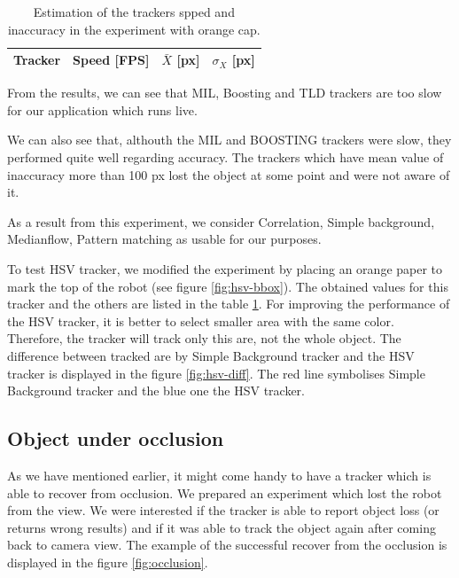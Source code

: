 \begin{table}
\centering
\begin{tabular}{l|r|r|r}
Tracker	& Speed [FPS] & $\bar{X}$ [px] & $\sigma_X$ [px] \\
\hline

\end{tabular}
\caption{Estimation of the trackers spped and inaccuracy in the experiment with orange cap.}
\label{table:hsv}
\end{table}

From the results, we can see that MIL, Boosting and TLD trackers are too slow
for our application which runs live.

We can also see that, althouth the MIL and BOOSTING trackers were slow, they
performed quite well regarding accuracy. The trackers which have mean value of
inaccuracy more than 100 px lost the object at some point and were not aware of
it.

As a result from this experiment, we consider Correlation, Simple background,
Medianflow, Pattern matching as usable for our purposes.

To test HSV tracker, we modified the experiment by placing an orange paper to
mark the top of the robot (see figure \ref{fig:hsv-bbox}). The obtained
values for this tracker and the others are listed in the table \ref{table:hsv}.
For improving the performance of the HSV tracker, it is better to select
smaller area with the same color. Therefore, the tracker will track only this
are, not the whole object. The difference between tracked are by Simple
Background tracker and the HSV tracker is displayed in the figure
\ref{fig:hsv-diff}. The red line symbolises Simple Background tracker and the
blue one the HSV tracker.


\subsection{Object under occlusion}

As we have mentioned earlier, it might come handy to have a tracker which is
able to recover from occlusion. We prepared an experiment which lost the
robot from the view. We were interested if the tracker is able to report object
loss (or returns wrong results) and if it was able to track the object again
after coming back to camera view. The example of the successful recover from
the occlusion is displayed in the figure \ref{fig:occlusion}.

